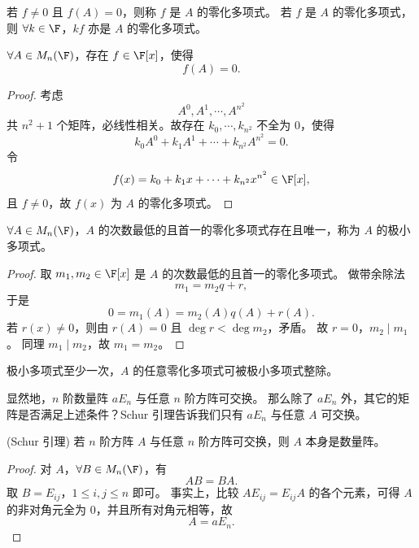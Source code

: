 \begin{definition}
	若 $f\neq0$ 且 $f(A)=0$，则称 $f$ 是 $A$ 的零化多项式。
	若 $f$ 是 $A$ 的零化多项式，则 $\forall k\in\F$，$kf$ 亦是 $A$ 的零化多项式。
\end{definition}

\begin{proposition}
	$\forall A\in M_n(\F)$，存在 $f\in\F[x]$，使得
	\[
	f(A)=0.
	\]
\end{proposition}

\begin{proof}
	考虑
	\[
	A^0,A^1,\cdots,A^{n^2}
	\]
	共 $n^2+1$ 个矩阵，必线性相关。故存在
	$k_0,\cdots,k_{n^2}$ 不全为 $0$，使得
	\[
	k_0A^0+k_1A^1+\cdots+k_{n^2}A^{n^2}=0.
	\]
	令
	\[
	f(x)=k_0+k_1x+\cdots+k_{n^2}x^{n^2}\in\F[x],
	\]
	且 $f\neq0$，故 $f(x)$ 为 $A$ 的零化多项式。
\end{proof}

\begin{proposition}
	$\forall A\in M_n(\F)$，$A$ 的次数最低的且首一的零化多项式存在且唯一，称为 $A$ 的极小多项式。
\end{proposition}

\begin{proof}
	取 $m_1,m_2\in\F[x]$ 是 $A$ 的次数最低的且首一的零化多项式。
	做带余除法
	\[
	m_1=m_2q+r,
	\]
	于是
	\[
	0=m_1(A)=m_2(A)q(A)+r(A).
	\]
	若 $r(x)\neq0$，则由 $r(A)=0$ 且 $\deg r<\deg m_2$，矛盾。
	故 $r=0$，$m_2\mid m_1$。
	同理 $m_1\mid m_2$，故 $m_1=m_2$。
\end{proof}

极小多项式至少一次，$A$ 的任意零化多项式可被极小多项式整除。

显然地，$n$ 阶数量阵 $aE_n$ 与任意 $n$ 阶方阵可交换。
那么除了 $aE_n$ 外，其它的矩阵是否满足上述条件？Schur 引理告诉我们只有 $aE_n$ 与任意 $A$ 可交换。

\begin{lemma}(Schur 引理)
	若 $n$ 阶方阵 $A$ 与任意 $n$ 阶方阵可交换，则 $A$ 本身是数量阵。
\end{lemma}

\begin{proof}
	对 $A$，$\forall B\in M_n(\F)$，有
	\[
	AB=BA.
	\]
	取 $B=E_{ij}$，$1\leq i,j\leq n$ 即可。
	事实上，比较 $AE_{ij}=E_{ij}A$ 的各个元素，可得 $A$ 的非对角元全为 $0$，并且所有对角元相等，故
	\[
	A=aE_n.
	\]
\end{proof}

